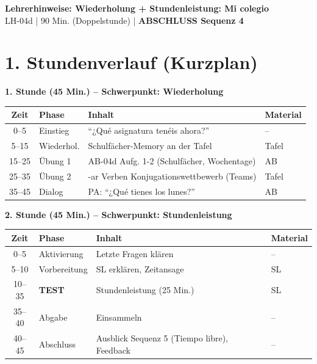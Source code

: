 \documentclass[11pt, a4paper]{article}
\newcommand{\fachfarbe}{spanisch}
\newcommand{\thema}{Wiederholung + Stundenleistung: Mi colegio}
\newcommand{\sequenz}{04}
\newcommand{\block}{d}
\newcommand{\dauer}{90 Min. (Doppelstunde)}
\begin{document}
\begin{center}
    {\Large\bfseries\textcolor{\fachfarbe}{Lehrerhinweise: \thema}}\\[0.3em]
    {\normalsize LH-\sequenz\block{} | \dauer{} | \textbf{ABSCHLUSS Sequenz 4}}
\end{center}

\vspace{10pt}

\section*{1. Stundenverlauf (Kurzplan)}

\textbf{1. Stunde (45 Min.) -- Schwerpunkt: Wiederholung}

\begin{tabularx}{\textwidth}{|c|l|X|l|}
\hline
\textbf{Zeit} & \textbf{Phase} & \textbf{Inhalt} & \textbf{Material} \\
\hline
0--5 & Einstieg & ``¿Qué asignatura tenéis ahora?'' & -- \\
\hline
5--15 & Wiederhol. & Schulfächer-Memory an der Tafel & Tafel \\
\hline
15--25 & Übung 1 & AB-04d Aufg. 1-2 (Schulfächer, Wochentage) & AB \\
\hline
25--35 & Übung 2 & -ar Verben Konjugationswettbewerb (Teams) & Tafel \\
\hline
35--45 & Dialog & PA: ``¿Qué tienes los lunes?'' & AB \\
\hline
\end{tabularx}

\vspace{1em}

\textbf{2. Stunde (45 Min.) -- Schwerpunkt: Stundenleistung}

\begin{tabularx}{\textwidth}{|c|l|X|l|}
\hline
\textbf{Zeit} & \textbf{Phase} & \textbf{Inhalt} & \textbf{Material} \\
\hline
0--5 & Aktivierung & Letzte Fragen klären & -- \\
\hline
5--10 & Vorbereitung & SL erklären, Zeitansage & SL \\
\hline
10--35 & \textbf{TEST} & Stundenleistung (25 Min.) & SL \\
\hline
35--40 & Abgabe & Einsammeln & -- \\
\hline
40--45 & Abschluss & Ausblick Sequenz 5 (Tiempo libre), Feedback & -- \\
\hline
\end{tabularx}
\end{document}
